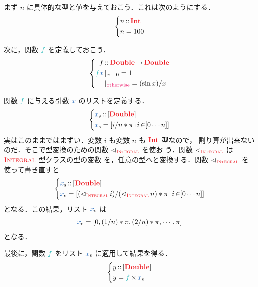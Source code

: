 \documentclass[a5paper,twoside,fleqn,draft]{jsbook}
\begin{document}
まず $n$ に具体的な型と値を与えておこう．これは次のようにする．
\begin{equation}
\left\{
\begin{aligned}
n&\hIsTypeOf\hInt\\
n&=100
\end{aligned}
\right.
\end{equation}

次に，関数 $\hFunc{f}$ を定義しておこう．
\begin{equation}
\left\{
\begin{aligned}
f&\hIsTypeOf\mProjEXP{\hDouble}{\hDouble}\\
\hFunc{f}\hVar{x}&\hGuard{x\hIfEq0}=1\\
&\hGuard{\hOtherwise}=(\sin x)/x
\end{aligned}
\right.
\end{equation}

関数 $\hFunc{f}$ に与える引数 $\hVar{x}$ のリストを定義する．
\begin{equation*}
  \left\{
  \begin{aligned}
    \hListVar{x}
    &\hIsTypeOf{}[\hDouble]\\
    \hListVar{x}
    &=[i/n*\pi\mListComp i\mFrom[0\dotsb n]]
  \end{aligned}
  \right.
\end{equation*}
実はこのままではまずい．変数 $i$ も変数 $n$ も $\hInt$ 型なので，
割り算が出来ないのだ．そこで型変換のための関数 $\hFromIntegral$ を使お
う．関数 $\hFromIntegral$ は $\hIntegral$ 型クラスの型の変数
を，任意の型へと変換する．関数 $\hFromIntegral$ を使って書き直すと
\begin{equation}
  \left\{
  \begin{aligned}
    \hListVar{x}
    &\hIsTypeOf{}[\hDouble]\\
    \hListVar{x}
    &=[(\hFromIntegral i)/(\hFromIntegral n)*\pi\mListComp i\mFrom[0\dotsb n]]
  \end{aligned}
  \right.
\end{equation}
となる．この結果，リスト $\hListVar{x}$ は
\begin{equation}
  \hListVar{x}
  =[0,(1/n)*\pi,(2/n)*\pi,\dotsb,\pi]
\end{equation}
となる．

最後に，関数 $\hFunc{f}$ をリスト $\hListVar{x}$ に適用して結果を得る．
\begin{equation}
  \left\{
  \begin{aligned}
    y
    &\hIsTypeOf{}[\hDouble]\\
    y
    &=\hFunc{f}\hMap\hListVar{x}
  \end{aligned}
  \right.
\end{equation}
\end{document}
